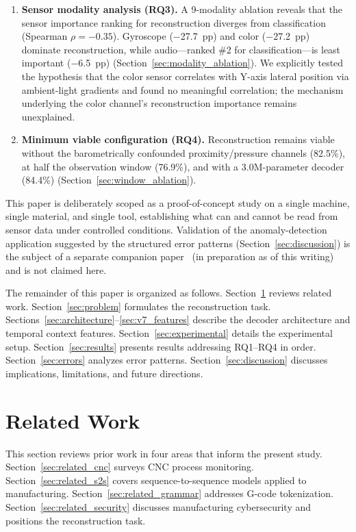 \documentclass[sensors,article,submit,moreauthors,pdftex]{Definitions/mdpi}
\begin{document}
\begin{enumerate}[leftmargin=*]
    \item \textbf{Sensor modality analysis (RQ3).} A 9-modality ablation reveals that the sensor importance ranking for reconstruction diverges from classification (Spearman $\rho = -0.35$). Gyroscope ($-$27.7~pp) and color ($-$27.2~pp) dominate reconstruction, while audio---ranked \#2 for classification---is least important ($-$6.5~pp) (Section~\ref{sec:modality_ablation}). We explicitly tested the hypothesis that the color sensor correlates with Y-axis lateral position via ambient-light gradients and found no meaningful correlation; the mechanism underlying the color channel's reconstruction importance remains unexplained.

    \item \textbf{Minimum viable configuration (RQ4).} Reconstruction remains viable without the barometrically confounded proximity/pressure channels (82.5\%), at half the observation window (76.9\%), and with a 3.0M-parameter decoder (84.4\%) (Section~\ref{sec:window_ablation}).
\end{enumerate}
This paper is deliberately scoped as a proof-of-concept study on a single machine, single material, and single tool, establishing what can and cannot be read from sensor data under controlled conditions. Validation of the anomaly-detection application suggested by the structured error patterns (Section~\ref{sec:discussion}) is the subject of a separate companion paper~\cite{anomaly_paper} (in preparation as of this writing) and is not claimed here.

The remainder of this paper is organized as follows. Section~\ref{sec:related} reviews related work. Section~\ref{sec:problem} formulates the reconstruction task. Sections~\ref{sec:architecture}--\ref{sec:v7_features} describe the decoder architecture and temporal context features. Section~\ref{sec:experimental} details the experimental setup. Section~\ref{sec:results} presents results addressing RQ1--RQ4 in order. Section~\ref{sec:errors} analyzes error patterns. Section~\ref{sec:discussion} discusses implications, limitations, and future directions.

\section{Related Work}
\label{sec:related}

This section reviews prior work in four areas that inform the present study. Section~\ref{sec:related_cnc} surveys CNC process monitoring. Section~\ref{sec:related_s2s} covers sequence-to-sequence models applied to manufacturing. Section~\ref{sec:related_grammar} addresses G-code tokenization. Section~\ref{sec:related_security} discusses manufacturing cybersecurity and positions the reconstruction task.
\end{document}
